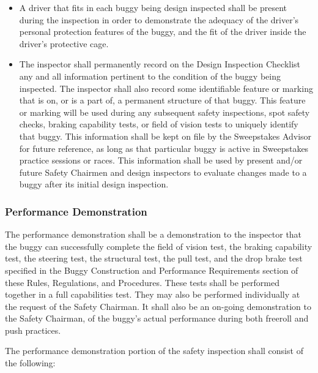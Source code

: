 \begin{itemize}
		\item
		A driver that fits in each buggy being design inspected shall be present during the inspection in order to demonstrate the adequacy of the driver's personal protection features of the buggy, and the fit of the driver inside the driver's protective cage.

		\item
		The inspector shall permanently record on the Design Inspection Checklist any and all information pertinent to the condition of the buggy being inspected. The inspector shall also record some identifiable feature or marking that is on, or is a part of, a permanent structure of that buggy. This feature or marking will be used during any subsequent safety inspections, spot safety checks, braking capability tests, or field of vision tests to uniquely identify that buggy. This information shall be kept on file by the Sweepstakes Advisor for future reference, as long as that particular buggy is active in Sweepstakes practice sessions or races. This information shall be used by present and/or future Safety Chairmen and design inspectors to evaluate changes made to a buggy after its initial design inspection.

	\end{itemize}

\subsubsection{Performance Demonstration}

	The performance demonstration shall be a demonstration to the inspector that the buggy can successfully complete the field of vision test, the braking capability test, the steering test, the structural test, the pull test, and the drop brake test specified in the Buggy Construction and Performance Requirements section of these Rules, Regulations, and Procedures. These tests shall be performed together in a full capabilities test. They may also be performed individually at the request of the Safety Chairman.  It shall also be an on-going demonstration to the Safety Chairman, of the buggy's actual performance during both freeroll and push practices.

	The performance demonstration portion of the safety inspection shall consist of the following:

